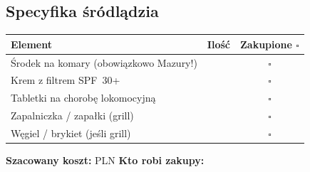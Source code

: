 \documentclass[a4paper,11pt]{article}
\begin{document}
\vspace{0.3cm}

\subsection*{Specyfika śródlądzia}
\begin{tabularx}{\linewidth}{|X|c|c|}
\hline
\textbf{Element} & \textbf{Ilość} & \textbf{Zakupione \(\square\)} \\
\hline
Środek na komary (obowiązkowo Mazury!) & & \(\square\) \\[4pt]\hline
Krem z filtrem SPF~30+ & & \(\square\) \\[4pt]\hline
Tabletki na chorobę lokomocyjną & & \(\square\) \\[4pt]\hline
Zapalniczka / zapałki (grill) & & \(\square\) \\[4pt]\hline
Węgiel / brykiet (jeśli grill) & & \(\square\) \\[4pt]\hline
\end{tabularx}

\vspace{0.4cm}
\noindent\textbf{Szacowany koszt:} \field{4cm} PLN \hfill \textbf{Kto robi zakupy:} \field{5cm}
\end{document}
